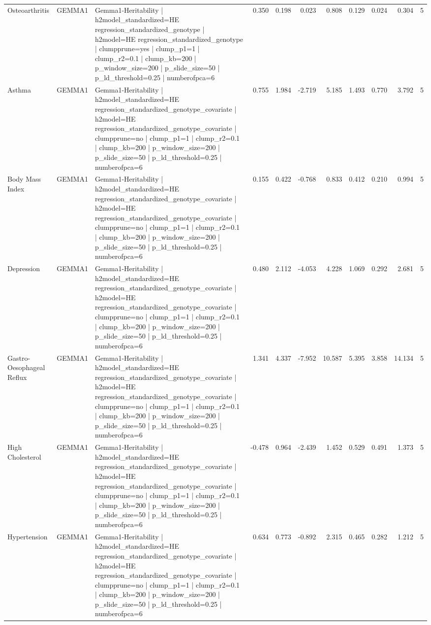 \begin{landscape}
\begin{longtable}{p{2.4cm}p{1.8cm}p{6.0cm}rrrrrrrr}
Osteoarthritis & GEMMA1 & Gemma1-Heritability | h2model\_standardized=HE regression\_standardized\_genotype | h2model=HE regression\_standardized\_genotype | clumpprune=yes | clump\_p1=1 | clump\_r2=0.1 | clump\_kb=200 | p\_window\_size=200 | p\_slide\_size=50 | p\_ld\_threshold=0.25 | numberofpca=6 & 0.350 & 0.198 & 0.023 & 0.808 & 0.129 & 0.024 & 0.304 & 5 \\
Asthma & GEMMA1 & Gemma1-Heritability | h2model\_standardized=HE regression\_standardized\_genotype\_covariate | h2model=HE regression\_standardized\_genotype\_covariate | clumpprune=no | clump\_p1=1 | clump\_r2=0.1 | clump\_kb=200 | p\_window\_size=200 | p\_slide\_size=50 | p\_ld\_threshold=0.25 | numberofpca=6 & 0.755 & 1.984 & -2.719 & 5.185 & 1.493 & 0.770 & 3.792 & 5 \\
Body Mass Index & GEMMA1 & Gemma1-Heritability | h2model\_standardized=HE regression\_standardized\_genotype\_covariate | h2model=HE regression\_standardized\_genotype\_covariate | clumpprune=no | clump\_p1=1 | clump\_r2=0.1 | clump\_kb=200 | p\_window\_size=200 | p\_slide\_size=50 | p\_ld\_threshold=0.25 | numberofpca=6 & 0.155 & 0.422 & -0.768 & 0.833 & 0.412 & 0.210 & 0.994 & 5 \\
Depression & GEMMA1 & Gemma1-Heritability | h2model\_standardized=HE regression\_standardized\_genotype\_covariate | h2model=HE regression\_standardized\_genotype\_covariate | clumpprune=no | clump\_p1=1 | clump\_r2=0.1 | clump\_kb=200 | p\_window\_size=200 | p\_slide\_size=50 | p\_ld\_threshold=0.25 | numberofpca=6 & 0.480 & 2.112 & -4.053 & 4.228 & 1.069 & 0.292 & 2.681 & 5 \\
Gastro-Oesophageal Reflux & GEMMA1 & Gemma1-Heritability | h2model\_standardized=HE regression\_standardized\_genotype\_covariate | h2model=HE regression\_standardized\_genotype\_covariate | clumpprune=no | clump\_p1=1 | clump\_r2=0.1 | clump\_kb=200 | p\_window\_size=200 | p\_slide\_size=50 | p\_ld\_threshold=0.25 | numberofpca=6 & 1.341 & 4.337 & -7.952 & 10.587 & 5.395 & 3.858 & 14.134 & 5 \\
High Cholesterol & GEMMA1 & Gemma1-Heritability | h2model\_standardized=HE regression\_standardized\_genotype\_covariate | h2model=HE regression\_standardized\_genotype\_covariate | clumpprune=no | clump\_p1=1 | clump\_r2=0.1 | clump\_kb=200 | p\_window\_size=200 | p\_slide\_size=50 | p\_ld\_threshold=0.25 | numberofpca=6 & -0.478 & 0.964 & -2.439 & 1.452 & 0.529 & 0.491 & 1.373 & 5 \\
Hypertension & GEMMA1 & Gemma1-Heritability | h2model\_standardized=HE regression\_standardized\_genotype\_covariate | h2model=HE regression\_standardized\_genotype\_covariate | clumpprune=no | clump\_p1=1 | clump\_r2=0.1 | clump\_kb=200 | p\_window\_size=200 | p\_slide\_size=50 | p\_ld\_threshold=0.25 | numberofpca=6 & 0.634 & 0.773 & -0.892 & 2.315 & 0.465 & 0.282 & 1.212 & 5 \\

\end{longtable}
\end{landscape}
